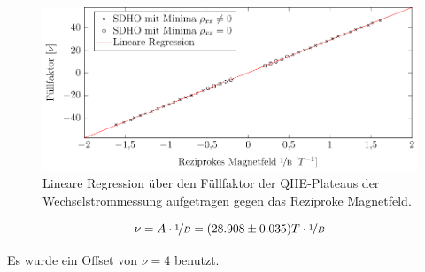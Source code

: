 \begin{figure}[h]
	\centering
	\includegraphics{graphs/ac/auswertung.pdf}
	\caption[Lineare Regression Wechselstrommessung]{
		Lineare Regression über den Füllfaktor der QHE-Plateaus der Wechselstrommessung aufgetragen gegen das Reziproke Magnetfeld.
	}
	\label{fig:ac_sdho_ausw}
\end{figure}

\begin{equation}
\nu= A\cdot \nicefrac{1}{B}=(28.908\pm 0.035)T \cdot \nicefrac{1}{B}
\end{equation}

Es wurde ein Offset von $\nu=4$ benutzt.